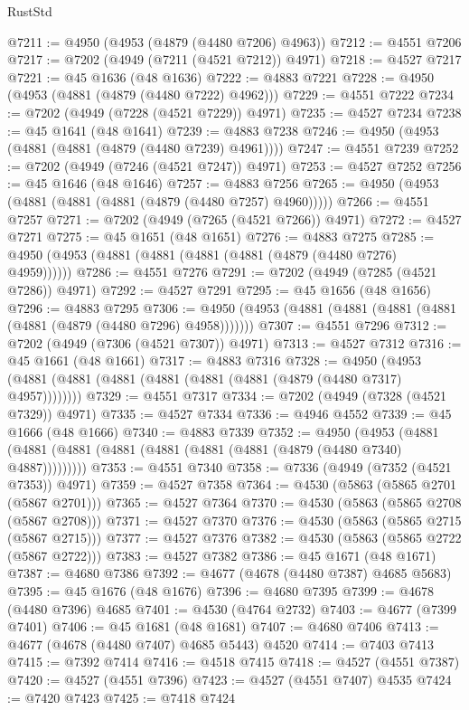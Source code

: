 \begin{lexlean}{RustStd}
\begin{coremodule}
@7211 := @4950 (@4953 (@4879 (@4480 @7206) @4963))
@7212 := @4551 @7206
@7217 := @7202 (@4949 (@7211 (@4521 @7212)) @4971)
@7218 := @4527 @7217
@7221 := @45 @1636 (@48 @1636)
@7222 := @4883 @7221
@7228 := @4950 (@4953 (@4881 (@4879 (@4480 @7222) @4962)))
@7229 := @4551 @7222
@7234 := @7202 (@4949 (@7228 (@4521 @7229)) @4971)
@7235 := @4527 @7234
@7238 := @45 @1641 (@48 @1641)
@7239 := @4883 @7238
@7246 := @4950 (@4953 (@4881 (@4881 (@4879 (@4480 @7239) @4961))))
@7247 := @4551 @7239
@7252 := @7202 (@4949 (@7246 (@4521 @7247)) @4971)
@7253 := @4527 @7252
@7256 := @45 @1646 (@48 @1646)
@7257 := @4883 @7256
@7265 := @4950 (@4953 (@4881 (@4881 (@4881 (@4879 (@4480 @7257) @4960)))))
@7266 := @4551 @7257
@7271 := @7202 (@4949 (@7265 (@4521 @7266)) @4971)
@7272 := @4527 @7271
@7275 := @45 @1651 (@48 @1651)
@7276 := @4883 @7275
@7285 := @4950 (@4953 (@4881 (@4881 (@4881 (@4881 (@4879 (@4480 @7276) @4959))))))
@7286 := @4551 @7276
@7291 := @7202 (@4949 (@7285 (@4521 @7286)) @4971)
@7292 := @4527 @7291
@7295 := @45 @1656 (@48 @1656)
@7296 := @4883 @7295
@7306 := @4950 (@4953 (@4881 (@4881 (@4881 (@4881 (@4881 (@4879 (@4480 @7296) @4958)))))))
@7307 := @4551 @7296
@7312 := @7202 (@4949 (@7306 (@4521 @7307)) @4971)
@7313 := @4527 @7312
@7316 := @45 @1661 (@48 @1661)
@7317 := @4883 @7316
@7328 := @4950 (@4953 (@4881 (@4881 (@4881 (@4881 (@4881 (@4881 (@4879 (@4480 @7317) @4957))))))))
@7329 := @4551 @7317
@7334 := @7202 (@4949 (@7328 (@4521 @7329)) @4971)
@7335 := @4527 @7334
@7336 := @4946 @4552
@7339 := @45 @1666 (@48 @1666)
@7340 := @4883 @7339
@7352 := @4950
    (@4953 (@4881 (@4881 (@4881 (@4881 (@4881 (@4881 (@4881 (@4879 (@4480 @7340) @4887)))))))))
@7353 := @4551 @7340
@7358 := @7336 (@4949 (@7352 (@4521 @7353)) @4971)
@7359 := @4527 @7358
@7364 := @4530 (@5863 (@5865 @2701 (@5867 @2701)))
@7365 := @4527 @7364
@7370 := @4530 (@5863 (@5865 @2708 (@5867 @2708)))
@7371 := @4527 @7370
@7376 := @4530 (@5863 (@5865 @2715 (@5867 @2715)))
@7377 := @4527 @7376
@7382 := @4530 (@5863 (@5865 @2722 (@5867 @2722)))
@7383 := @4527 @7382
@7386 := @45 @1671 (@48 @1671)
@7387 := @4680 @7386
@7392 := @4677 (@4678 (@4480 @7387) @4685 @5683)
@7395 := @45 @1676 (@48 @1676)
@7396 := @4680 @7395
@7399 := @4678 (@4480 @7396) @4685
@7401 := @4530 (@4764 @2732)
@7403 := @4677 (@7399 @7401)
@7406 := @45 @1681 (@48 @1681)
@7407 := @4680 @7406
@7413 := @4677 (@4678 (@4480 @7407) @4685 @5443) @4520
@7414 := @7403 @7413
@7415 := @7392 @7414
@7416 := @4518 @7415
@7418 := @4527 (@4551 @7387)
@7420 := @4527 (@4551 @7396)
@7423 := @4527 (@4551 @7407) @4535
@7424 := @7420 @7423
@7425 := @7418 @7424

\end{coremodule}
\end{lexlean}
